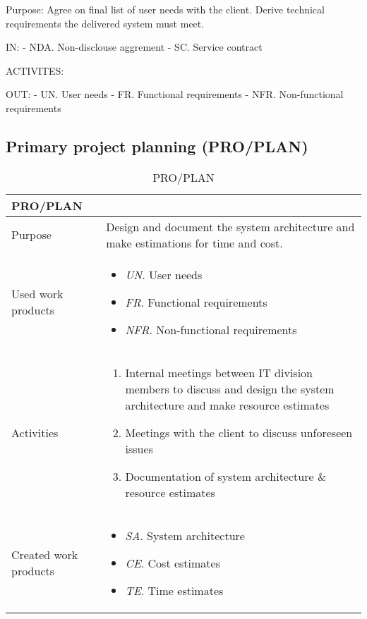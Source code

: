 Purpose: Agree on final list of user needs with the client. Derive technical requirements the delivered system must meet.

IN: 
    - NDA. Non-disclouse aggrement
    - SC. Service contract %

ACTIVITES:


OUT:
    - UN. User needs
    - FR. Functional requirements
    - NFR. Non-functional requirements

\newpage
\subsection{Primary project planning (PRO/PLAN)}

\begin{table}[h!]
\begin{tabular}{l|p{}}
\hline
\textbf{PRO/PLAN}        & \textbf{} \\ \hline
Purpose & Design and document the system architecture and make estimations for time and cost.   \\ \hline
Used work products    &      
\begin{itemize}
    \item \textit{UN}. User needs
    \item \textit{FR}. Functional requirements
    \item \textit{NFR}. Non-functional requirements
\end{itemize}
\\ \hline
Activities            &   
\begin{enumerate}
    \item Internal meetings between IT division members to discuss and design the system architecture and make resource estimates
    \item Meetings with the client to discuss unforeseen issues
    \item Documentation of system architecture \& resource estimates
\end{enumerate}
\\ \hline
Created work products &     
\begin{itemize}
    \item \textit{SA}. System architecture
    \item \textit{CE}. Cost estimates
    \item \textit{TE}. Time estimates
\end{itemize}
\end{tabular}
\caption{PRO/PLAN}
\label{pro/plan}
\end{table}

